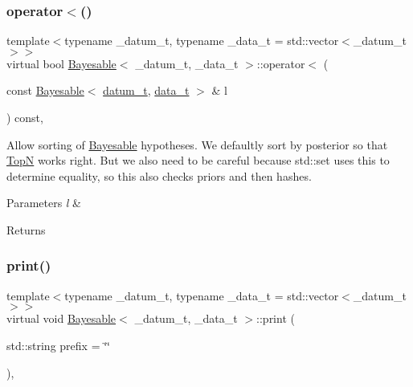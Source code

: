 \subsubsection{\texorpdfstring{operator$<$()}{operator<()}}
{\footnotesize\ttfamily template$<$typename \+\_\+datum\+\_\+t, typename \+\_\+data\+\_\+t = std\+::vector$<$\+\_\+datum\+\_\+t$>$$>$ \\
virtual bool \hyperlink{class_bayesable}{Bayesable}$<$ \+\_\+datum\+\_\+t, \+\_\+data\+\_\+t $>$\+::operator$<$ (\begin{DoxyParamCaption}\item[{const \hyperlink{class_bayesable}{Bayesable}$<$ \hyperlink{class_bayesable_a9f1a6c0cd7855550fa10b1a8f13a5867}{datum\+\_\+t}, \hyperlink{class_bayesable_aa2788c4d7718c0a824e1d28c4c98f921}{data\+\_\+t} $>$ \&}]{l }\end{DoxyParamCaption}) const\hspace{0.3cm}{\ttfamily [inline]}, {\ttfamily [virtual]}}

Allow sorting of \hyperlink{class_bayesable}{Bayesable} hypotheses. We defaultly sort by posterior so that \hyperlink{class_top_n}{TopN} works right. But we also need to be careful because std\+::set uses this to determine equality, so this also checks priors and then hashes. 
\begin{DoxyParams}{Parameters}
{\em l} & \\
\hline
\end{DoxyParams}
\begin{DoxyReturn}{Returns}

\end{DoxyReturn}
\mbox{\label{class_bayesable_a87d5d9481d6a72b017e44b175071fa5e}} 
\subsubsection{\texorpdfstring{print()}{print()}}
{\footnotesize\ttfamily template$<$typename \+\_\+datum\+\_\+t, typename \+\_\+data\+\_\+t = std\+::vector$<$\+\_\+datum\+\_\+t$>$$>$ \\
virtual void \hyperlink{class_bayesable}{Bayesable}$<$ \+\_\+datum\+\_\+t, \+\_\+data\+\_\+t $>$\+::print (\begin{DoxyParamCaption}\item[{std\+::string}]{prefix = {\ttfamily \char`\"{}\char`\"{}} }\end{DoxyParamCaption})\hspace{0.3cm}{\ttfamily [inline]}, {\ttfamily [virtual]}}

